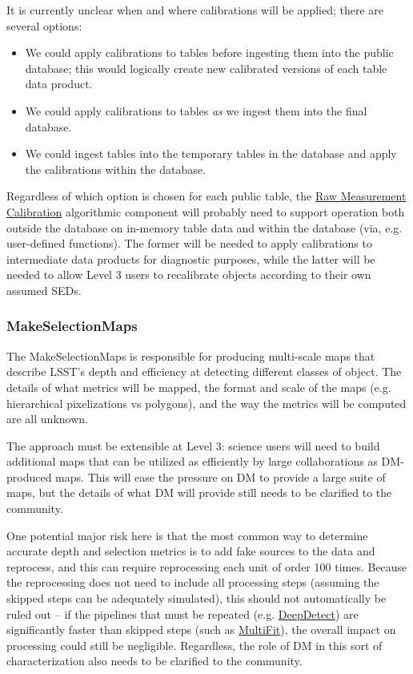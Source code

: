 It is currently unclear when and where calibrations will be applied; there are several options:
\begin{itemize}
\item We could apply calibrations to tables before ingesting them into the public database; this would logically create new calibrated versions of each table data product.
\item We could apply calibrations to tables \emph{as} we ingest them into the final database.
\item We could ingest tables into the temporary tables in the database and apply the calibrations within the database.
\end{itemize}
Regardless of which option is chosen for each public table, the \hyperref[sec:acRawMeasurementCalibration]{Raw Measurement Calibration} algorithmic component will probably need to support operation both outside the database on in-memory table data and within the database (via, e.g. user-defined functions).  The former will be needed to apply calibrations to intermediate data products for diagnostic purposes, while the latter will be needed to allow Level 3 users to recalibrate objects according to their own assumed SEDs.

\subsubsection{MakeSelectionMaps}
\label{sec:drpMakeSelectionMaps}

The MakeSelectionMaps is responsible for producing multi-scale maps that describe LSST's depth and efficiency at detecting different classes of object.  The details of what metrics will be mapped, the format and scale of the maps (e.g. hierarchical pixelizations vs polygons), and the way the metrics will be computed are all unknown.

The approach must be extensible at Level 3: science users will need to build additional maps that can be utilized as efficiently by large collaborations as DM-produced maps.  This will ease the pressure on DM to provide a large suite of maps, but the details of what DM will provide still needs to be clarified to the community.

One potential major risk here is that the most common way to determine accurate depth and selection metrics is to add fake sources to the data and reprocess, and this can require reprocessing each unit of order 100 times.  Because the reprocessing does not need to include all processing steps (assuming the skipped steps can be adequately simulated), this should not automatically be ruled out -- if the pipelines that must be repeated (e.g. \hyperref[sec:drpDeepDetect]{DeepDetect}) are significantly faster than skipped steps (such as \hyperref[sec:drpMultiFit]{MultiFit}), the overall impact on processing could still be negligible.  Regardless, the role of DM in this sort of characterization also needs to be clarified to the community.

